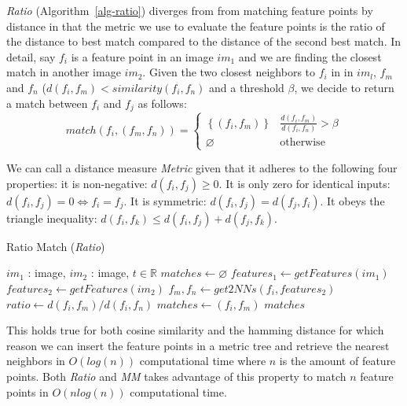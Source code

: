 \emph{Ratio} (Algorithm~\ref{alg-ratio}) \cite{lowe2004sift} diverges 
from from matching feature points by distance in that the metric we use 
to evaluate the feature points is the ratio of the distance to best 
match compared to the distance of the second best match. In detail, say 
$f_i$ is a feature point in an image $im_1$ and we are finding the 
closest match in another image $im_2$. Given the two closest neighbors 
to $f_i$ in in $im_l$, $f_m$ and $f_n$ ($d(f_i,f_m) < 
similarity(f_i,f_n)$ and a threshold $\beta$, we decide to return a 
match between $f_i$ and $f_j$ as follows:
\begin{equation*}
    match(f_i,(f_m,f_n)) = \begin{cases}
        \left\{(f_i,f_m)\right\} &
        \frac{d(f_i,f_m)}{d(f_i,f_n)} > \beta \\ \varnothing & 
        \mbox{otherwise}
    \end{cases}
\end{equation*}


We can call a distance measure \emph{Metric} given that it adheres to 
the following four properties: it is non-negative: $d(f_i,f_j) \geq 0$.  
It is only zero for identical inputs: $d(f_i,f_j) = 0 \Leftrightarrow 
f_i = f_j$. It is symmetric: $d(f_i,f_j) = d(f_j,f_i)$. It obeys the 
triangle inequality: $d(f_i,f_k) \leq d(f_i,f_j) + d(f_j,f_k)$.

\begin{algorithm}[t]
\caption{Ratio Match (\emph{Ratio})}
\label{alg-ratio}
\begin{algorithmic}
\Require $im_1$ : image, $im_2$ : image, $t \in \mathbb{R}$
\State $matches\gets \varnothing$
\State $features_1 \gets getFeatures(im_1)$
\State $features_2 \gets getFeatures(im_2)$
    \State $f_m,f_n \gets get2NNs(f_i, features_2)$
    \State $ratio \gets d(f_i, f_m) / d(f_i, f_n)$
        \State $matches \gets \left(f_i, f_m\right)$
	\EndIf
\EndFor
\Return $matches$
\end{algorithmic}
\end{algorithm}

This holds true for both cosine similarity and the hamming distance for 
which reason we can insert the feature points in a metric tree and 
retrieve the nearest neighbors in $O(log(n))$ computational time where 
$n$ is the amount of feature points.  Both \emph{Ratio} and \emph{MM} 
takes advantage of this property to match $n$ feature points in 
$O(nlog(n))$ computational time.


